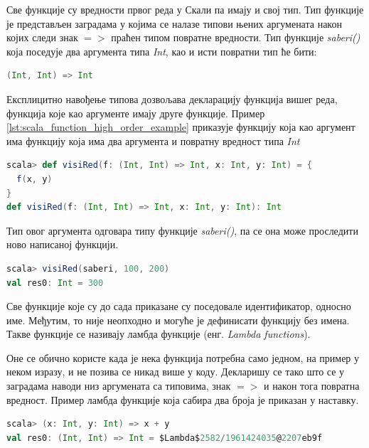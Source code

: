 \documentclass[12pt,oneside]{memoir}
\begin{document}
Све функције су вредности првог реда у Скали па имају и свој тип. Тип функције је представљен заградама у којима се налазе типови њених аргумената након којих следи знак $=>$ праћен типом повратне вредности. Тип функције \textit{saberi()} која поседује два аргумента типа \textit{Int}, као и исти повратни тип ће бити:

\begin{lstlisting}[language=Scala, caption={Тип функције saberi()}, label={lst:scala_function_add_example_type}]
(Int, Int) => Int
\end{lstlisting}

Експлицитно навођење типова дозвољава декларацију функција вишег реда, функција које као аргументе имају друге функције. Пример \ref{lst:scala_function_high_order_example} приказује функцију која као аргумент има функцију која има два аргумента и повратну вредност типа \textit{Int}

\begin{lstlisting}[language=Scala, caption={Функција вишег реда}, label={lst:scala_function_high_order_example}]
scala> def visiRed(f: (Int, Int) => Int, x: Int, y: Int) = {
  f(x, y)
}
def visiRed(f: (Int, Int) => Int, x: Int, y: Int): Int
\end{lstlisting}

Тип овог аргумента одговара типу функције \textit{saberi()}, па се она може проследити ново написаној функцији.

\begin{lstlisting}[language=Scala, caption={Прослеђивање функције функцији}, label={lst:scala_function_add_high_order}]
scala> visiRed(saberi, 100, 200)
val res0: Int = 300
\end{lstlisting}

Све функције које су до сада приказане су поседовале идентификатор, односно име. Међутим, то није неопходно и могуће је дефинисати функцију без имена. Такве функције се називају ламбда функције (енг. \textit{Lambda functions}).

Оне се обично користе када је нека функција потребна само једном, на пример у неком изразу, и не позива се никад више у коду. Декларишу се тако што се у заградама наводи низ аргумената са типовима, знак $=>$ и након тога повратна вредност. Пример ламбда функције која сабира два броја је приказан у наставку.

\begin{lstlisting}[language=Scala, caption={Пример ламбда функције}, label={lst:scala_function_lambda_example}]
scala> (x: Int, y: Int) => x + y
val res0: (Int, Int) => Int = $Lambda$2582/1961424035@2207eb9f
\end{lstlisting}
\end{document}
